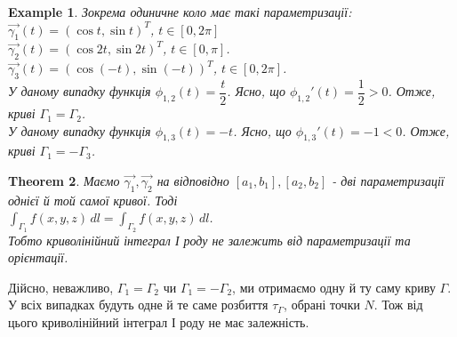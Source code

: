 \documentclass[a4paper, 10pt]{article}
\theoremstyle{theoremdd}
\newtheorem{theorem}{Theorem}[subsection]
\theoremstyle{theoremdd}
\theoremstyle{theoremdd}
\theoremstyle{theoremdd}
\theoremstyle{theoremdd}
\newtheorem{example}[theorem]{Example}
\theoremstyle{theoremdd}
\theoremstyle{theoremdd}
\theoremstyle{theoremdd}
\theoremstyle{theoremdd}
\theoremstyle{theoremdd}
\theoremstyle{theoremdd}
\theoremstyle{theoremdd}
\theoremstyle{theoremdd}
\theoremstyle{theoremdd}
\theoremstyle{theoremdd}
\begin{document}
\begin{example}
Зокрема одиничне коло має такі параметризації:\\
$\vec{\gamma_1}(t) = (\cos t, \sin t)^T$, $t \in [0,2\pi]$\\
$\vec{\gamma_2}(t) = (\cos 2t, \sin 2t)^T$, $t \in [0,\pi]$.\\
$\vec{\gamma_3}(t) = (\cos(-t), \sin(-t))^T$, $t \in [0,2\pi]$.\\
У даному випадку функція $\phi_{1,2}(t) = \dfrac{t}{2}$. Ясно, що $\phi_{1,2}'(t) = \dfrac{1}{2} > 0$. Отже, криві $\Gamma_1 = \Gamma_2$.\\
У даному випадку функція $\phi_{1,3}(t) = -t$. Ясно, що $\phi_{1,3}'(t) = -1 < 0$. Отже, криві $\Gamma_1 = -\Gamma_3$.
\begin{figure}[H]
\centering
{}
\qquad
{}
\qquad
{}
\end{figure}
\end{example}

\begin{theorem}
Маємо $\vec{\gamma_1},\vec{\gamma_2}$ на відповідно $[a_1,b_1], [a_2,b_2]$ - дві параметризації однієї й той самої кривої. Тоді\\
$\displaystyle\int_{\Gamma_1} f(x,y,z)\,dl = \int_{\Gamma_2} f(x,y,z)\,dl$.\\
Тобто криволінійний інтеграл І роду не залежить від параметризації та орієнтації.
\end{theorem}

Дійсно, неважливо, $\Gamma_1 = \Gamma_2$ чи $\Gamma_1 = -\Gamma_2$, ми отримаємо одну й ту саму криву $\Gamma$. У всіх випадках будуть одне й те саме розбиття $\tau_\Gamma$, обрані точки $N$. Тож від цього криволінійний інтеграл І роду не має залежність.
\end{document}
